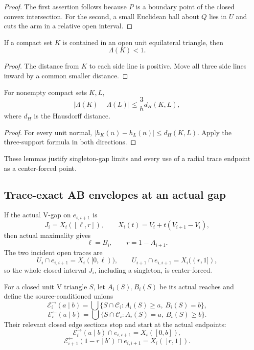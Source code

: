 \begin{proof}
The first assertion follows because $P$ is a boundary point of the closed
convex intersection.  For the second, a small Euclidean ball about $Q$ lies
in $U$ and cuts the arm in a relative open interval.
\end{proof}

\begin{lemma}
\label{lem:new-compact-open-shrink}
If a compact set $K$ is contained in an open unit equilateral triangle, then
\[
 \Lambda(K)<1.
\]
\end{lemma}

\begin{proof}
The distance from $K$ to each side line is positive.  Move all three side
lines inward by a common smaller distance.
\end{proof}

\begin{lemma}
\label{lem:new-lambda-continuity}
For nonempty compact sets $K,L$,
\[
 |\Lambda(K)-\Lambda(L)|
 \le\frac3h d_H(K,L),
\]
where $d_H$ is the Hausdorff distance.
\end{lemma}

\begin{proof}
For every unit normal,
$|h_K(n)-h_L(n)|\le d_H(K,L)$.  Apply the three-support formula in both
directions.
\end{proof}

These lemmas justify singleton-gap limits and every use of a radial trace
endpoint as a center-forced point.

\subsection{Trace-exact AB envelopes at an actual gap}
\label{subsec:trace-exact-ab-envelopes}

If the actual V-gap on $e_{i,i+1}$ is
\[
 J_i=X_i([\ell,r]),
 \qquad X_i(t)=V_i+t(V_{i+1}-V_i),
\]
then actual maximality gives
\[
 \boxed{\ell=B_i,\qquad r=1-A_{i+1}.}
 \tag{6.24a}
\]
The two incident open traces are
\[
 U_i\cap e_{i,i+1}=X_i([0,\ell)),
 \qquad
 U_{i+1}\cap e_{i,i+1}=X_i((r,1]),
 \tag{6.24b}
\]
so the whole closed interval $J_i$, including a singleton, is center-forced.

For a closed unit V triangle $S$, let $A_i(S),B_i(S)$ be its actual reaches
and define the source-conditioned unions
\[
 \mathcal E_i^{\rightarrow}(a\mid b)
 =
 \bigcup\{S\cap\mathcal C_i:A_i(S)\ge a,\ B_i(S)=b\},
 \tag{6.24c}
\]
\[
 \mathcal E_i^{\leftarrow}(a\mid b)
 =
 \bigcup\{S\cap\mathcal C_i:A_i(S)=a,\ B_i(S)\ge b\}.
 \tag{6.24d}
\]
Their relevant closed edge sections stop and start at the actual endpoints:
\[
 \mathcal E_i^{\rightarrow}(a\mid b)\cap e_{i,i+1}
 =X_i([0,b]),
\]
\[
 \mathcal E_{i+1}^{\leftarrow}(1-r\mid b')\cap e_{i,i+1}
 =X_i([r,1]).
 \tag{6.24e}
\]

